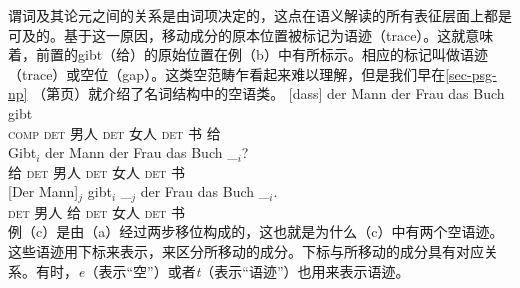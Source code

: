 谓词及其论元之间的关系是由词项决定的，这点在语义解读的所有表征层面上都是可及的。基于这一原因，移动成分的原本位置被标记为语迹（trace）。这就意味着，前置的gibt（给）的原始位置在例（b）中有所标示。相应的标记叫做语迹（trace）或空位（gap）。这类空范畴乍看起来难以理解，但是我们早在\ref{sec-psg-np} （第\pageref{np-epsilon}页）就介绍了名词结构中的空语类。
\eal
\ex 
\gll {}[dass] der Mann der Frau das Buch gibt\\
	 {}\spacebr{}\textsc{comp} \textsc{det} 男人 \textsc{det} 女人 \textsc{det} 书 给\\
\ex 
\gll Gibt$_i$ der Mann der Frau das Buch \_$_i$?\\
	 给 \textsc{det} 男人 \textsc{det} 女人 \textsc{det} 书\\
\ex 
\gll {}[Der Mann]$_j$ gibt$_i$ \_$_j$ der Frau das Buch \_$_i$.\\
	 {}\spacebr{}\textsc{det} 男人 给 {} \textsc{det} 女人 \textsc{det} 书\\
\zl
例（c）是由（a）经过两步移位构成的，这也就是为什么（c）中有两个空语迹。这些语迹用下标来表示，来区分所移动的成分。下标与所移动的成分具有对应关系。有时，\emph{e}（表示“空”）或者\emph{t}（表示“语迹”）也用来表示语迹。


